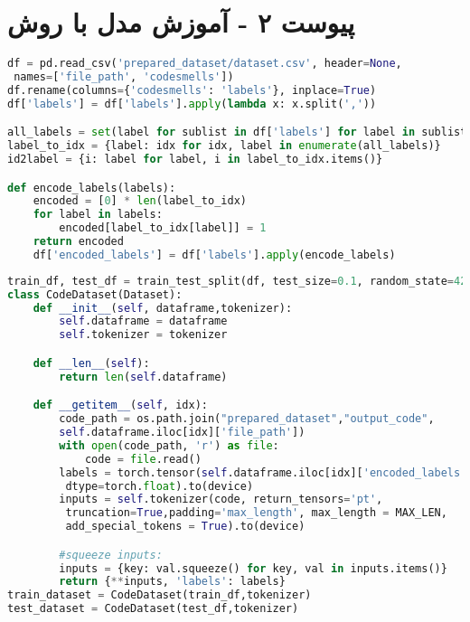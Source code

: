 \chapter*{پیوست ۲ - آموزش مدل با روش }

\begin{latin}
	\begin{lstlisting}[language=Python, title=\rl{بارگذاری داده ها و ایجاد لیبل ها بصورت \lr{one hot}}]
df = pd.read_csv('prepared_dataset/dataset.csv', header=None,
 names=['file_path', 'codesmells'])
df.rename(columns={'codesmells': 'labels'}, inplace=True)
df['labels'] = df['labels'].apply(lambda x: x.split(','))

all_labels = set(label for sublist in df['labels'] for label in sublist)
label_to_idx = {label: idx for idx, label in enumerate(all_labels)}
id2label = {i: label for label, i in label_to_idx.items()}

def encode_labels(labels):
    encoded = [0] * len(label_to_idx)
    for label in labels:
        encoded[label_to_idx[label]] = 1
    return encoded
	df['encoded_labels'] = df['labels'].apply(encode_labels)
\end{lstlisting}
\end{latin}

\begin{latin}
	\begin{lstlisting}[language=Python, title=\rl{جدا کردن داده های آزمون و آموزش و ساخت دیتاست}]
train_df, test_df = train_test_split(df, test_size=0.1, random_state=42, shuffle=True)
class CodeDataset(Dataset):
    def __init__(self, dataframe,tokenizer):
        self.dataframe = dataframe
        self.tokenizer = tokenizer

    def __len__(self):
        return len(self.dataframe)

    def __getitem__(self, idx):
        code_path = os.path.join("prepared_dataset","output_code",
		self.dataframe.iloc[idx]['file_path'])
        with open(code_path, 'r') as file:
            code = file.read()
        labels = torch.tensor(self.dataframe.iloc[idx]['encoded_labels'],
		 dtype=torch.float).to(device)
        inputs = self.tokenizer(code, return_tensors='pt',
		 truncation=True,padding='max_length', max_length = MAX_LEN,
		 add_special_tokens = True).to(device)

        #squeeze inputs:
        inputs = {key: val.squeeze() for key, val in inputs.items()}
        return {**inputs, 'labels': labels}
train_dataset = CodeDataset(train_df,tokenizer)
test_dataset = CodeDataset(test_df,tokenizer)
\end{lstlisting}
\end{latin}

